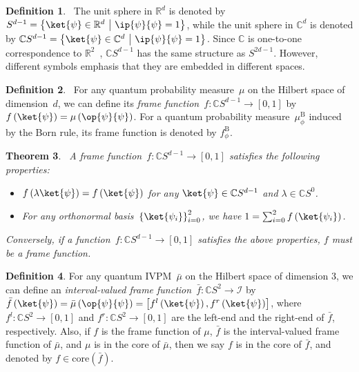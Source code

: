\documentclass[12pt]{iopart}
\theoremstyle{plain}
\newtheorem{thm}{Theorem}
\theoremstyle{definition}
\newtheorem{definition}[thm]{Definition}
\theoremstyle{remark}
\newcommand{\proj}[1]{\op{#1}{#1}}
\newcommand{\set}[2]{\ensuremath{\left\{ {#1}~\middle|~{#2}\right\} }}
\begin{document}
\begin{definition}\cite{Hatcher2001,dryden2005}~The unit sphere
in $\mathbb{R}^{d}$ is denoted by $S^{d-1}=\set{\ket{\psi}\in\mathbb{R}^{d}}{\ip{\psi}{\psi}=1}$,
while the unit sphere in $\mathbb{C}^{d}$ is denoted by $\mathbb{C}S^{d-1}=\set{\ket{\psi}\in\mathbb{C}^{d}}{\ip{\psi}{\psi}=1}$.
Since $\mathbb{C}$ is one-to-one correspondence to $\mathbb{R}^{2}$~\cite{GAMELIN2003},
$\mathbb{C}S^{d-1}$ has the same structure as $S^{2d-1}$. However,
different symbols emphasis that they are embedded in different spaces.\end{definition}

\begin{definition}\cite{gleason1957,peres1995quantum,RichmanBridges1999}~For
any quantum probability measure~$\mu$ on the Hilbert space of dimension~$d$,
we can define its \emph{frame function}~$f:\mathbb{C}S^{d-1}\rightarrow\left[0,1\right]$
by $f\left(\ket{\psi}\right)=\mu\left(\proj{\psi}\right)$. For a
quantum probability measure~$\mu_{\phi}^{\mathrm{B}}$ induced by the Born
rule, its frame function is denoted by $f_{\phi}^{\mathrm{B}}$.\end{definition}

\begin{thm}\label{thm:frame-function}\cite{gleason1957,peres1995quantum,RichmanBridges1999}~A
frame function~$f:\mathbb{C}S^{d-1}\rightarrow\left[0,1\right]$
satisfies the following properties: 
\begin{itemize}
\item $f\left(\lambda\ket{\psi}\right)=f\left(\ket{\psi}\right)$ for any
$\ket{\psi}\in\mathbb{C}S^{d-1}$ and $\lambda\in\mathbb{C}S^{0}$. 
\item For any orthonormal basis~$\left\{ \ket{\psi_{i}}\right\} _{i=0}^{2}$,
we have $1=\sum_{i=0}^{2}f\left(\ket{\psi_{i}}\right)$. 
\end{itemize}
Conversely, if a function~$f:\mathbb{C}S^{d-1}\rightarrow\left[0,1\right]$
satisfies the above properties, $f$ must be a frame function.\end{thm}

\begin{definition}For any quantum IVPM~$\bar{\mu}$ on the Hilbert
space of dimension 3, we can define an \emph{interval-valued frame
function}~$\bar{f}:\mathbb{C}S^{2}\rightarrow\mathscr{I}$ by $\bar{f}\left(\ket{\psi}\right)=\bar{\mu}\left(\proj{\psi}\right)=\left[f^{l}\left(\ket{\psi}\right),f^{r}\left(\ket{\psi}\right)\right]$,
where $f^{l}:\mathbb{C}S^{2}\rightarrow\left[0,1\right]$ and $f^{r}:\mathbb{C}S^{2}\rightarrow\left[0,1\right]$
are the left-end and the right-end of $\bar{f}$, respectively. Also,
if $f$ is the frame function of $\mu$, $\bar{f}$ is the interval-valued
frame function of $\bar{\mu}$, and $\mu$ is in the core of $\bar{\mu}$,
then we say $f$ is in the core of $\bar{f}$, and denoted by $f\in\mathrm{core}\left(\bar{f}\right)$.\end{definition}
\end{document}
